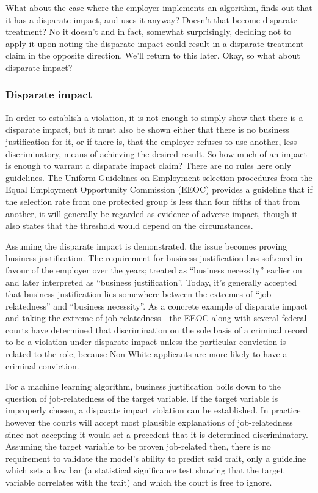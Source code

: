 What about the case where the employer implements an algorithm, finds out that it has a disparate impact, and uses it anyway? Doesn't that become disparate treatment? No it doesn't and in fact, somewhat surprisingly, deciding not to apply it upon noting the disparate impact could result in a disparate treatment claim in the opposite direction\cite{FireFighters}. We'll return to this later. Okay, so what about disparate impact?

\subsubsection*{Disparate impact}
%
In order to establish a violation, it is not enough to simply show that there is a disparate impact, but it must also be shown either that there is no business justification for it, or if there is, that the employer refuses to use another, less discriminatory, means of achieving the desired result. So how much of an impact is enough to warrant a disparate impact claim? There are no rules here only guidelines. The Uniform Guidelines on Employment selection procedures from the Equal Employment Opportunity Commission (EEOC) provides a guideline that if the selection rate from one protected group is less than four fifths of that from another, it will generally be regarded as evidence of adverse impact, though it also states that the threshold would depend on the circumstances.

Assuming the disparate impact is demonstrated, the issue becomes proving business justification. The requirement for business justification has softened in favour of the employer over the years; treated as ``business necessity''\cite{BusinessNecessity} earlier on and later interpreted as ``business justification''\cite{BusinessJustification}. Today, it's generally accepted that business justification lies somewhere between the extremes of ``job-relatedness'' and ``business necessity''.  As a concrete example of disparate impact and taking the extreme of job-relatedness - the EEOC along with several federal courts have determined that discrimination on the sole basis of a criminal record to be a violation under disparate impact unless the particular conviction is related to the role, because Non-White applicants are more likely to have a criminal conviction.

For a machine learning algorithm, business justification boils down to the question of job-relatedness of the target variable. If the target variable is improperly chosen, a disparate impact violation can be established. In practice however the courts will accept most plausible explanations of job-relatedness since not accepting it would set a precedent that it is determined discriminatory. Assuming the target variable to be proven job-related then, there is no requirement to validate the model's ability to predict said trait, only a guideline which sets a low bar (a statistical significance test showing that the target variable correlates with the trait) and which the court is free to ignore.

